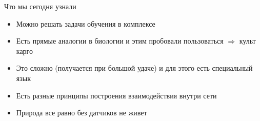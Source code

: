 \documentclass[14pt, fleqn, xcolor={dvipsnames, table}]{beamer}
\begin{document}
\begin{frame}{Что мы сегодня узнали}
\begin{itemize}
  \item Можно решать задачи обучения в комплексе
  \item Есть прямые аналогии в биологии и этим пробовали пользоваться $\Rightarrow$ культ карго 
  \item Это сложно (получается при большой удаче) и для этого есть специальный язык
  \item Есть разные принципы построения взаимодействия внутри сети
  \item Природа все равно без датчиков не живет
\end{itemize}
\end{frame}
\end{document}
